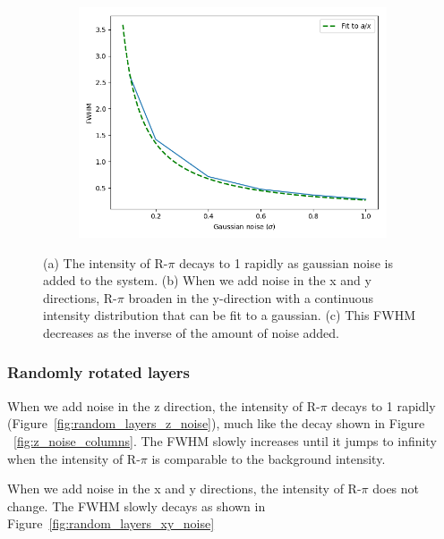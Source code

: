 \documentclass{article}
\begin{document}
\begin{figure}[!htb]
\begin{subfigure}{0.32\textwidth}
  \includegraphics[width=\textwidth]{random_columns_xy_noise.png}
  \caption{}\label{fig:FWHM_columns}
  \end{subfigure}
  \caption{(a) The intensity of R-$\pi$ decays to 1 rapidly as gaussian noise is 
   added to the system. (b) When we add noise in the x and y directions, R-$\pi$
   broaden in the y-direction with a continuous intensity distribution that can be
   fit to a gaussian. (c) This FWHM decreases as the inverse of the amount of 
   noise added.}\label{fig:columns_noise}
  \end{figure}

  \subsubsection{Randomly rotated layers}

  When we add noise in the z direction, the intensity of R-$\pi$ decays to 1
  rapidly (Figure~\ref{fig:random_layers_z_noise}), much like the decay shown in
  Figure ~\ref{fig:z_noise_columns}. The FWHM slowly increases until it jumps to
  infinity when the intensity of R-$\pi$ is comparable to the background
  intensity.

  When we add noise in the x and y directions, the intensity of R-$\pi$ does not change.
  The FWHM slowly decays as shown in Figure~\ref{fig:random_layers_xy_noise}
\end{document}
